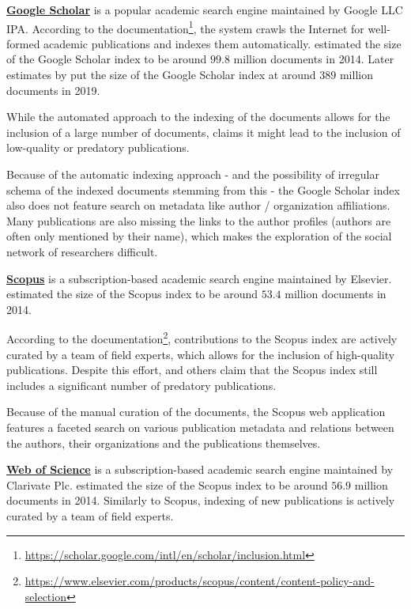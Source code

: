 \textbf{\href{https://scholar.google.com/}{Google Scholar}} is a popular academic search engine maintained by Google LLC IPA.
According to the documentation\footnote{\url{https://scholar.google.com/intl/en/scholar/inclusion.html}}, the system crawls the Internet for well-formed academic publications and indexes them automatically. 
\cite{google-scholar-size-estimation-2014} estimated the size of the Google Scholar index to be around $99.8$ million documents in 2014.
Later estimates by \cite{google-scholar-size} put the size of the Google Scholar index at around $389$ million documents in 2019.

While the automated approach to the indexing of the documents allows for the inclusion of a large number of documents, 
\cite{predatory-google-scholar-scopus} claims it might lead to the inclusion of low-quality or predatory publications.

Because of the automatic indexing approach - and the possibility of irregular schema of the indexed documents stemming from this -
the Google Scholar index also does not feature search on metadata like author / organization affiliations.
Many publications are also missing the links to the author profiles (authors are often only mentioned by their name), 
which makes the exploration of the social network of researchers difficult.

\textbf{\href{https://www.scopus.com/}{Scopus}} is a subscription-based academic search engine maintained by Elsevier.    
\cite{google-scholar-size-estimation-2014} estimated the size of the Scopus index to be around $53.4$ million documents in 2014.

According to the documentation\footnote{\url{https://www.elsevier.com/products/scopus/content/content-policy-and-selection}}, contributions to the Scopus index 
are actively curated by a team of field experts, which allows for the inclusion of high-quality publications.
Despite this effort, \cite{predatory-scopus} and others claim that the Scopus index still includes a significant number of predatory publications.

Because of the manual curation of the documents, the Scopus web application features a faceted search on various publication metadata
and relations between the authors, their organizations and the publications themselves.

\textbf{\href{https://www.webofscience.com/}{Web of Science}} is a subscription-based academic search engine maintained by Clarivate Plc.
\cite{google-scholar-size-estimation-2014} estimated the size of the Scopus index to be around $56.9$ million documents in 2014.
Similarly to Scopus, indexing of new publications is actively curated by a team of field experts.

